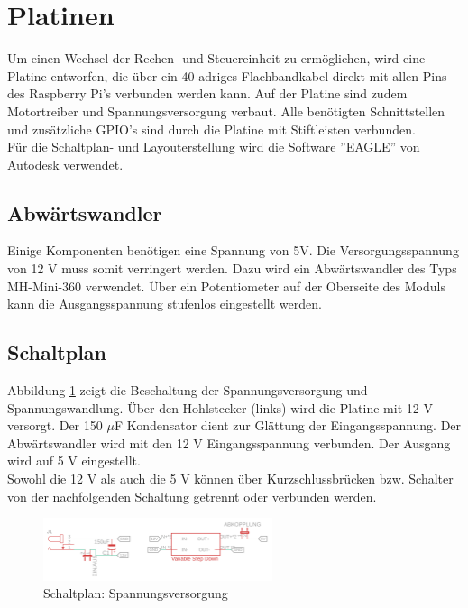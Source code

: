 \section{Platinen}

Um einen Wechsel der Rechen- und Steuereinheit zu ermöglichen, wird eine Platine entworfen, die über ein 40 adriges Flachbandkabel direkt mit allen Pins des Raspberry Pi's verbunden werden kann. Auf der Platine sind zudem Motortreiber und Spannungsversorgung verbaut. Alle benötigten Schnittstellen und zusätzliche \ac{GPIO}’s sind durch die Platine mit Stiftleisten verbunden.\\
Für die Schaltplan- und Layouterstellung wird die Software ''EAGLE'' von Autodesk verwendet.


\subsection{Abwärtswandler} 

Einige Komponenten benötigen eine Spannung von 5V. Die Versorgungsspannung von 12 V muss somit verringert werden. Dazu wird ein Abwärtswandler des Typs MH-Mini-360 verwendet. Über ein Potentiometer auf der Oberseite des Moduls kann die Ausgangsspannung stufenlos eingestellt werden.

\subsection{Schaltplan} \label{sec:Schaltplan} 
Abbildung \ref{spannung} zeigt die Beschaltung der Spannungsversorgung und Spannungswandlung. Über den Hohlstecker (links) wird die Platine mit 12 V versorgt. Der 150 $\mu$F Kondensator dient zur Glättung der Eingangsspannung. Der Abwärtswandler wird mit den 12 V Eingangsspannung verbunden. Der Ausgang wird auf 5 V eingestellt. \\
Sowohl die 12 V als auch die 5 V können über Kurzschlussbrücken bzw. Schalter von der nachfolgenden Schaltung getrennt oder verbunden werden.    

\begin{figure}[H]
	\centering
	\includegraphics[width=0.6\textwidth]{images/Hardware/Schaltplan/Spannung}
	\caption{Schaltplan: Spannungsversorgung}
	\label{spannung}
\end{figure}

